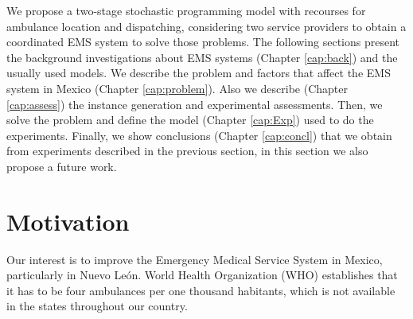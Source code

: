 
We propose a two-stage stochastic programming model with recourses for ambulance location and dispatching, considering two service providers to obtain a coordinated EMS system to solve those problems. The following sections present the background investigations about EMS sys\-tems (Chapter \ref{cap:back}) and the usually used models. We describe the problem and factors that affect the EMS system in Mexico (Chapter \ref{cap:problem}). Also we describe (Chapter \ref{cap:assess}) the instance generation and experimental assessments. Then, we solve the problem and define the model (Chapter \ref{cap:Exp}) used to do the experiments. Finally, we show conclusions (Chapter \ref{cap:concl}) that we obtain from experiments described in the previous section, in this section we also propose a future work.

\section{Motivation}
Our interest is to improve the Emergency Medical Service System in Mexico, par\-ti\-cu\-lar\-ly in Nuevo León. World Health Organization (WHO) establishes that it has to be four ambulances per one thousand habitants, which is not available in the states throughout our country.

